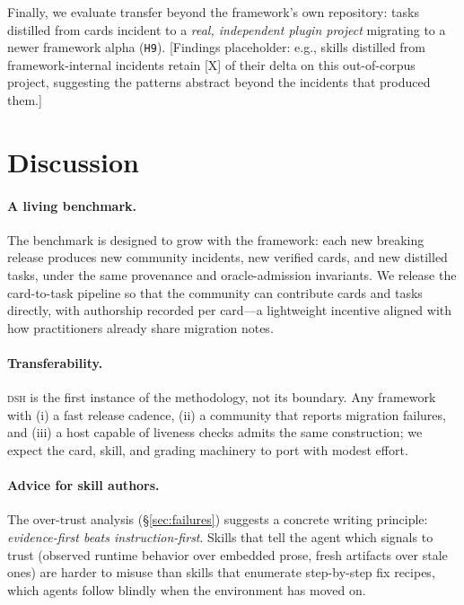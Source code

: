 \documentclass[11pt]{article}
\newcommand{\framework}{\textsc{dsh}}
\begin{document}
Finally, we evaluate transfer beyond the framework's own repository: tasks distilled from cards incident to a \emph{real, independent plugin project} migrating to a newer framework alpha (\texttt{H9}).
[Findings placeholder: e.g., skills distilled from framework-internal incidents retain [X] of their delta on this out-of-corpus project, suggesting the patterns abstract beyond the incidents that produced them.]

\section{Discussion}
\label{sec:discussion}

\paragraph{A living benchmark.}
The benchmark is designed to grow with the framework: each new breaking release produces new community incidents, new verified cards, and new distilled tasks, under the same provenance and oracle-admission invariants.
We release the card-to-task pipeline so that the community can contribute cards and tasks directly, with authorship recorded per card---a lightweight incentive aligned with how practitioners already share migration notes.

\paragraph{Transferability.}
\framework{} is the first instance of the methodology, not its boundary.
Any framework with (i) a fast release cadence, (ii) a community that reports migration failures, and (iii) a host capable of liveness checks admits the same construction; we expect the card, skill, and grading machinery to port with modest effort.

\paragraph{Advice for skill authors.}
The over-trust analysis (\S\ref{sec:failures}) suggests a concrete writing principle: \emph{evidence-first beats instruction-first}.
Skills that tell the agent which signals to trust (observed runtime behavior over embedded prose, fresh artifacts over stale ones) are harder to misuse than skills that enumerate step-by-step fix recipes, which agents follow blindly when the environment has moved on.
\end{document}
